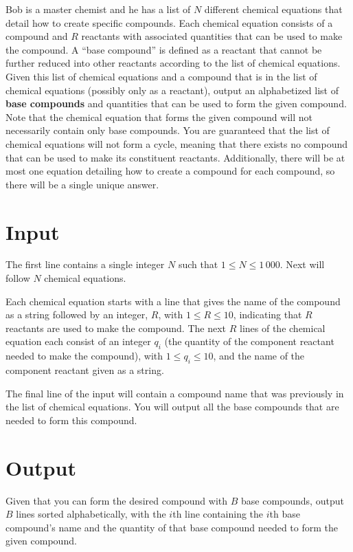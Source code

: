 
Bob is a master chemist and he has a list of $N$ different chemical equations that detail how to
create specific compounds. Each chemical equation consists of a compound and $R$ reactants with
associated quantities that can be used to make the compound. A ``base compound'' is defined as a reactant
that cannot be further reduced into other reactants according to the list of chemical equations.
Given this list of chemical equations and a compound that is in the list of chemical equations
(possibly only as a reactant), output an alphabetized list of \textbf{base compounds} and quantities that
can be used to form the given compound. Note that the chemical equation that forms the given 
compound will not necessarily contain only base compounds. You are guaranteed that the list of chemical
equations will not form a cycle, meaning that there exists no compound that can be used to make its
constituent reactants. Additionally, there will be at most one equation detailing how to create a
compound for each compound, so there will be a single unique answer.

\section*{Input}
The first line contains a single integer $N$ such that $1 \leq N \leq 1\,000$.
Next will follow $N$ chemical equations. 

Each chemical equation starts with a line that gives the name of the compound as a string followed
by an integer, $R$, with $1 \leq R \leq 10$, indicating that $R$ reactants are used to make the compound.
The next $R$ lines of the chemical equation each consist of an integer $q_i$ (the quantity of
the component reactant needed to make the compound), with $1 \leq q_i \leq 10$, and the name of the
component reactant given as a string.

The final line of the input will contain a compound name that was previously in the list of chemical
equations. You will output all the base compounds that are needed to form this compound.

\section*{Output}
Given that you can form the desired compound with $B$ base compounds, output $B$ lines
sorted alphabetically, with the $i$th line containing the $i$th base compound's name and the quantity of
that base compound needed to form the given compound.
